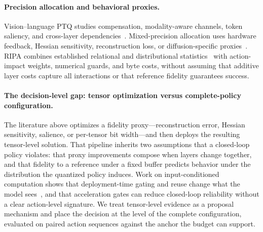 \paragraph{Precision allocation and behavioral proxies.}
Vision--language PTQ studies compensation, modality-aware channels, token saliency, and cross-layer dependencies~\citep{deng2026vlmptq,xue2026vlmq,wang2024qvlm,wang2026bivlm}. Mixed-precision allocation uses hardware feedback, Hessian sensitivity, reconstruction loss, or diffusion-specific proxies~\citep{wang2019haq,wang2019hawq,dong2020hawqv2,hubara2021accurate,li2021brecq,zhao2024mixdq}. RIPA combines established relational and distributional statistics~\citep{kornblith2019similarity,yin2026csaligner} with action-impact weights, numerical guards, and byte costs, without assuming that additive layer costs capture all interactions or that reference fidelity guarantees success.

\paragraph{The decision-level gap: tensor optimization versus complete-policy configuration.}
The literature above optimizes a fidelity proxy---reconstruction error, Hessian sensitivity, salience, or per-tensor bit width---and then deploys the resulting tensor-level solution. That pipeline inherits two assumptions that a closed-loop policy violates: that proxy improvements compose when layers change together, and that fidelity to a reference under a fixed buffer predicts behavior under the distribution the quantized policy induces. Work on input-conditioned computation shows that deployment-time gating and reuse change what the model sees~\citep{xu2025vlacache,zhang2025molevla}, and that acceleration gates can reduce closed-loop reliability without a clear action-level signature. We treat tensor-level evidence as a proposal mechanism and place the decision at the level of the complete configuration, evaluated on paired action sequences against the anchor the budget can support.
